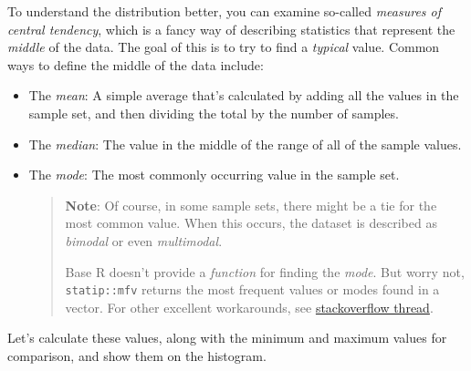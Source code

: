 \documentclass[
]{article}
\begin{document}
To understand the distribution better, you can examine so-called
\emph{measures of central tendency}, which is a fancy way of describing
statistics that represent the \emph{middle} of the data. The goal of
this is to try to find a \emph{typical} value. Common ways to define the
middle of the data include:

\begin{itemize}
\item
  The \emph{mean}: A simple average that's calculated by adding all the
  values in the sample set, and then dividing the total by the number of
  samples.
\item
  The \emph{median}: The value in the middle of the range of all of the
  sample values.
\item
  The \emph{mode}: The most commonly occurring value in the sample set.

  \begin{quote}
  \textbf{Note}: Of course, in some sample sets, there might be a tie
  for the most common value. When this occurs, the dataset is described
  as \emph{bimodal} or even \emph{multimodal}.

  Base R doesn't provide a \emph{function} for finding the \emph{mode}.
  But worry not, \texttt{statip::mfv} returns the most frequent values
  or modes found in a vector. For other excellent workarounds, see
  \href{https://stackoverflow.com/questions/2547402/how-to-find-the-statistical-mode}{stackoverflow
  thread}.
  \end{quote}
\end{itemize}

Let's calculate these values, along with the minimum and maximum values
for comparison, and show them on the histogram.
\end{document}

